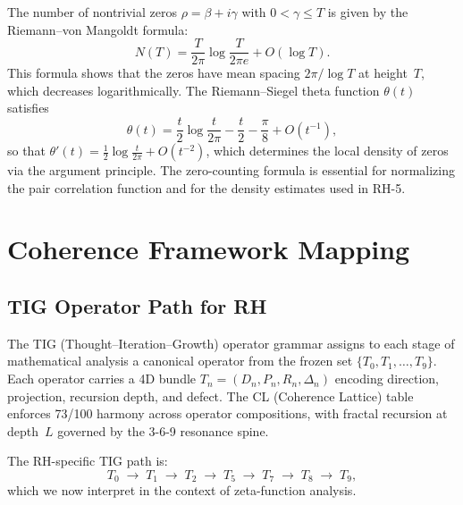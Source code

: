 \documentclass[11pt]{article}
\theoremstyle{remark}
\begin{document}
The number of nontrivial zeros $\rho=\beta+i\gamma$ with $0<\gamma\leq T$ is
given by the Riemann--von Mangoldt formula:
\begin{equation}\label{eq:RvM-counting}
  N(T) = \frac{T}{2\pi}\log\frac{T}{2\pi e} + O(\log T).
\end{equation}
This formula shows that the zeros have mean spacing $2\pi/\log T$ at height~$T$,
which decreases logarithmically.
The Riemann--Siegel theta function $\theta(t)$ satisfies
\begin{equation}\label{eq:theta-asymp}
  \theta(t) = \frac{t}{2}\log\frac{t}{2\pi} - \frac{t}{2} - \frac{\pi}{8}
  + O(t^{-1}),
\end{equation}
so that $\theta'(t)=\frac{1}{2}\log\frac{t}{2\pi}+O(t^{-2})$, which determines
the local density of zeros via the argument principle.
The zero-counting formula is essential for normalizing the pair correlation
function and for the density estimates used in RH-5.

\section{Coherence Framework Mapping}
\label{sec:framework}

\subsection{TIG Operator Path for RH}
\label{subsec:tig-path}

The TIG (Thought--Iteration--Growth) operator grammar assigns to each stage of
mathematical analysis a canonical operator from the frozen set
$\{T_0,T_1,\ldots,T_9\}$.
Each operator carries a 4D bundle $T_n=(D_n,P_n,R_n,\Delta_n)$ encoding
direction, projection, recursion depth, and defect.
The CL (Coherence Lattice) table enforces 73/100 harmony across operator
compositions, with fractal recursion at depth~$L$ governed by the 3-6-9 resonance
spine.

The RH-specific TIG path is:
\begin{equation}\label{eq:tig-path}
  T_0 \;\to\; T_1 \;\to\; T_2 \;\to\; T_5 \;\to\; T_7 \;\to\; T_8 \;\to\; T_9,
\end{equation}
which we now interpret in the context of zeta-function analysis.
\end{document}
